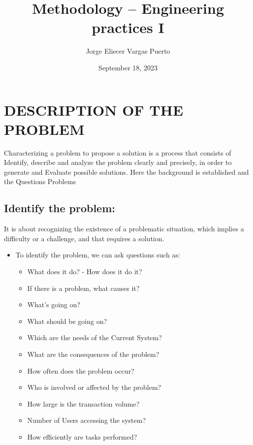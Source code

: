 \documentclass{article}
\title{Methodology – Engineering practices I}
\author{Jorge Eliecer Vargas Puerto}
\date{September 18, 2023}
\begin{document}
\maketitle

\tableofcontents

\section{DESCRIPTION OF THE PROBLEM}
\par Characterizing a problem to propose a solution is a process that consists
of Identify, describe and analyze the problem clearly and precisely, in order to
generate and Evaluate possible solutions. Here the background is established and
the Questions Problems

\subsection{Identify the problem:}
\par It is about recognizing the existence of a problematic situation, which
implies a difficulty or a challenge, and that requires a solution.

\begin{itemize}
	\item
	      To identify the problem, we can ask questions such as:
	      \begin{itemize}
		      \item What does it do? - How does it do it?
		      \item If there is a problem, what causes it?
		      \item What's going on?
		      \item What should be going on?
		      \item Which are the needs of the Current System?
		      \item What are the consequences of the problem?
		      \item How often does the problem occur?
		      \item Who is involved or affected by the problem?
		      \item How large is the transaction volume?
		      \item Number of Users accessing the system?
		      \item How efficiently are tasks performed?
	      \end{itemize}
\end{itemize}
\end{document}
